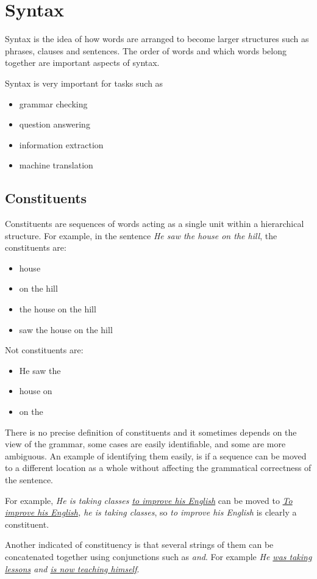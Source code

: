 \documentclass[Report.tex]{subfiles}
\begin{document}
\section{Syntax}
Syntax is the idea of how words are arranged to become larger structures such as
phrases, clauses and sentences. The order of words and which words belong
together are important aspects of syntax.

Syntax is very important for tasks such as
\begin{itemize}
\item grammar checking
\item question answering
\item information extraction
\item machine translation
\end{itemize}

\subsection{Constituents}
Constituents are sequences of words acting as a single unit within a
hierarchical structure. For example, in the sentence \textit{He saw the house
on the hill}, the constituents are:
\begin{itemize}
\item house
\item on the hill
\item the house on the hill
\item saw the house on the hill
\end{itemize}
Not constituents are:
\begin{itemize}
\item He saw the
\item house on
\item on the
\end{itemize}
There is no precise definition of constituents and it sometimes depends on the
view of the grammar, some cases are easily identifiable, and some are more
ambiguous. An example of identifying them easily, is if a sequence can be
moved to a different location as a whole without affecting the grammatical
correctness of the sentence.

For example, \textit{He is taking classes \underline{to improve his English}} can
be moved to \textit{\underline{To improve his English}, he is taking classes},
so \textit{to improve his English} is clearly a constituent.

Another indicated of constituency is that several strings of them can be
concatenated together using conjunctions such as \textit{and}. For example
\textit{He \underline{was taking lessons} and \underline{is now teaching himself}}.
\end{document}
